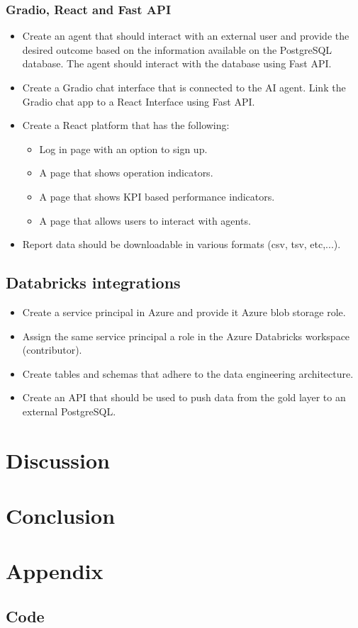 \documentclass{article}
\begin{document}
 \subsubsection{Gradio, React and Fast API}
    \begin{itemize}
        \item Create an agent that should interact with an external user and provide the desired outcome based on the information available on the PostgreSQL database. The agent should
        interact with the database using Fast API.
        \item Create a Gradio chat interface that is connected to the AI agent. Link the Gradio chat app to a React Interface using Fast API.
        \item Create a React platform that has the following:
            \begin{itemize}
                \item Log in page with an option to sign up.
                \item A page that shows operation indicators.
                \item A page that shows KPI based performance indicators.
                \item A page that allows users to interact with agents.
            \end{itemize}
        \item Report data should be downloadable in various formats (csv, tsv, etc,...).
    \end{itemize}
\subsection{Databricks integrations}
\begin{itemize}
    \item Create a service principal in Azure and provide it Azure blob storage role.
    \item Assign the same service principal a role in the Azure Databricks workspace (contributor).
    \item Create tables and schemas that adhere to the data engineering architecture.
    \item Create an API that should be used to push data from the gold layer to an external PostgreSQL.
\end{itemize}

\section{Discussion}

\section{Conclusion}

\section{Appendix}
\subsection{Code}
\end{document}
